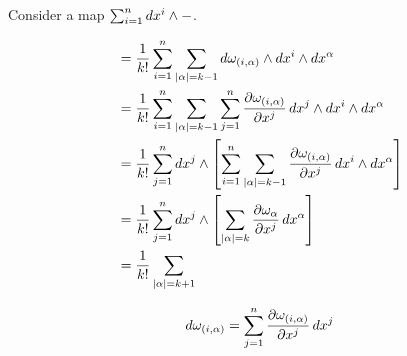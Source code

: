 \documentclass{../exp}
\begin{document}
\begin{pf}
Consider a map $\sum_{i=1}^ndx^i\wedge-$.

\begin{align*}
&=\frac1{k!}\sum_{i=1}^n\sum_{|\alpha|=k-1}d\omega_{(i,\alpha)}\wdg dx^i\wdg dx^\alpha\\
&=\frac1{k!}\sum_{i=1}^n\sum_{|\alpha|=k-1}\sum_{j=1}^n\pd{\omega_{(i,\alpha)}}{x^j}\,dx^j\wdg dx^i\wdg dx^\alpha\\
&=\frac1{k!}\sum_{j=1}^ndx^j\wdg\left[\sum_{i=1}^n\sum_{|\alpha|=k-1}\pd{\omega_{(i,\alpha)}}{x^j}\,dx^i\wdg dx^\alpha\right]\\
&=\frac1{k!}\sum_{j=1}^ndx^j\wdg\left[\sum_{|\alpha|=k}\pd{\omega_\alpha}{x^j}\,dx^\alpha\right]\\
&=\frac1{k!}\sum_{|\alpha|=k+1}
\end{align*}

\[d\omega_{(i,\alpha)}=\sum_{j=1}^n\pd{\omega_{(i,\alpha)}}{x^j}\,dx^j\]
\end{pf}
\end{document}
